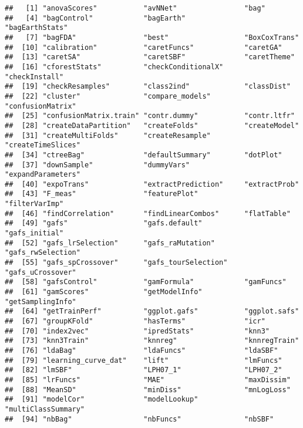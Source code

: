 \documentclass[
]{book}
\begin{document}
\begin{verbatim}
##   [1] "anovaScores"           "avNNet"                "bag"                  
##   [4] "bagControl"            "bagEarth"              "bagEarthStats"        
##   [7] "bagFDA"                "best"                  "BoxCoxTrans"          
##  [10] "calibration"           "caretFuncs"            "caretGA"              
##  [13] "caretSA"               "caretSBF"              "caretTheme"           
##  [16] "cforestStats"          "checkConditionalX"     "checkInstall"         
##  [19] "checkResamples"        "class2ind"             "classDist"            
##  [22] "cluster"               "compare_models"        "confusionMatrix"      
##  [25] "confusionMatrix.train" "contr.dummy"           "contr.ltfr"           
##  [28] "createDataPartition"   "createFolds"           "createModel"          
##  [31] "createMultiFolds"      "createResample"        "createTimeSlices"     
##  [34] "ctreeBag"              "defaultSummary"        "dotPlot"              
##  [37] "downSample"            "dummyVars"             "expandParameters"     
##  [40] "expoTrans"             "extractPrediction"     "extractProb"          
##  [43] "F_meas"                "featurePlot"           "filterVarImp"         
##  [46] "findCorrelation"       "findLinearCombos"      "flatTable"            
##  [49] "gafs"                  "gafs.default"          "gafs_initial"         
##  [52] "gafs_lrSelection"      "gafs_raMutation"       "gafs_rwSelection"     
##  [55] "gafs_spCrossover"      "gafs_tourSelection"    "gafs_uCrossover"      
##  [58] "gafsControl"           "gamFormula"            "gamFuncs"             
##  [61] "gamScores"             "getModelInfo"          "getSamplingInfo"      
##  [64] "getTrainPerf"          "ggplot.gafs"           "ggplot.safs"          
##  [67] "groupKFold"            "hasTerms"              "icr"                  
##  [70] "index2vec"             "ipredStats"            "knn3"                 
##  [73] "knn3Train"             "knnreg"                "knnregTrain"          
##  [76] "ldaBag"                "ldaFuncs"              "ldaSBF"               
##  [79] "learning_curve_dat"    "lift"                  "lmFuncs"              
##  [82] "lmSBF"                 "LPH07_1"               "LPH07_2"              
##  [85] "lrFuncs"               "MAE"                   "maxDissim"            
##  [88] "MeanSD"                "minDiss"               "mnLogLoss"            
##  [91] "modelCor"              "modelLookup"           "multiClassSummary"    
##  [94] "nbBag"                 "nbFuncs"               "nbSBF"                

\end{verbatim}
\end{document}

